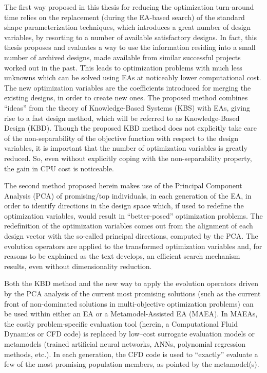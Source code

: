 The first way proposed in this thesis for reducing the optimization turn-around time relies on the replacement (during the EA-based search) of the standard shape parameterization techniques, which introduces a great number of design variables, by resorting to a number of available satisfactory designs.  In fact, this thesis proposes and evaluates a way to use the information residing into a small number of archived designs, made available from similar successful projects worked out in the past. This leads to optimization problems with much less unknowns which can be solved using EAs at noticeably lower computational cost. The new optimization variables are the coefficients introduced for merging the existing designs, in order to create new ones. The proposed method combines ``ideas'' from the theory of Knowledge-Based Systems (KBS) with EAs, giving rise to a fast design method, which will be referred to as Knowledge-Based Design (KBD). Though the proposed KBD method does not explicitly take care of the non-separability of the objective function with respect to the design variables, it is important that the number of optimization variables is greatly reduced. So, even without explicitly coping with the non-separability property, the gain in CPU cost is noticeable.
 
The second method proposed  herein makes use of the Principal Component Analysis (PCA) of promising/top individuals, in each generation of the EA, in order to identify directions in the design space which, if used to redefine the optimization variables, would result in ``better-posed'' optimization problems.  The redefinition of the optimization variables comes out from the alignment of each design vector with the so-called principal directions, computed by the PCA.  The evolution operators are applied to the transformed optimization variables and, for reasons to be explained as the text develops, an efficient search mechanism results, even without dimensionality reduction. 
 
Both the KBD method and the new way to apply the evolution operators driven by the PCA analysis of the current most promising solutions (such as the current front of non-dominated solutions in multi-objective optimization problems) can be used within either an EA or a Metamodel-Assisted EA (MAEA). In MAEAs, the costly problem-specific evaluation tool (herein, a Computational Fluid Dynamics or CFD code) is replaced by low--cost surrogate evaluation models or metamodels (trained artificial neural networks, ANNs, polynomial regression methods, etc.). In each generation, the CFD code is used to ``exactly'' evaluate a few of the most promising population members, as pointed by the metamodel(s).  
 
